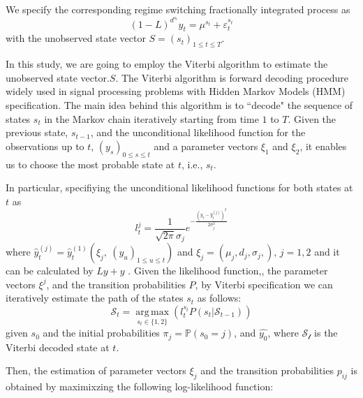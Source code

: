 \documentclass[11pt,fleqn]{article}
\DeclareMathOperator*{\argmax}{arg\,max}
\begin{document}
We specify the corresponding regime switching fractionally integrated
process as 
\begin{equation}
\left( 1-L\right) ^{d^{s_{t}}}y_{t}=\mu ^{s_{t}}+\varepsilon _{t}^{s_{t}}
\end{equation}
with the unobserved state vector $S=(s_t)_{1 \leq t\leq T} $.

In this study, we are going to employ the Viterbi algorithm to estimate the
unobserved state vector.$S$. The Viterbi algorithm is forward decoding
procedure widely used in signal processing problems with Hidden Markov
Models (HMM) specification. The main idea behind this algorithm is to
\textquotedblleft decode" the sequence of states $s_{t}$ in the Markov chain
iteratively starting from time $1$ to $T$. Given the previous state, $%
s_{t-1} $, and the unconditional likelihood function for the observations up
to $t$, $(y_{s})_{0\leq s\leq t}$ and a parameter vectors $\xi _{1}$ and $%
\xi _{2}$, it enables us to choose the most probable state at $t$, i.e., $%
s_{t}$.

In particular, specifiying the unconditional likelihood functions for both
states at $t $ as 
\begin{equation}
l^j_t = \frac{1}{\sqrt{2 \pi} \sigma_{j}} e^{-\frac{ (y_{t}-\hat{y}%
^{(j)}_{t})^2}{2 \sigma_{j}^2}}
\end{equation}
where $\hat{y}^{(j)}_t=\hat{y}^{(1)}_t(\xi_j, \ (y_u)_{1 \leq u\leq t})$ and 
$\xi_j= (\mu_j, d_j,\sigma_j,) $, $j=1,2 $ and it can be calculated by $Ly+y 
$ . Given the likelihood function,, the parameter vectors $\xi^j $, and the
transition probabilities $P $, by Viterbi specification we can iteratively
estimate the path of the states $s_t $ as follows: 
\begin{equation}
\mathcal{S}_t= \argmax \limits_{s_t \in \{1,2\}}( l^{s_t}_t P(s_t|\mathcal{S}%
_{t-1}))
\end{equation}
given $s_0 $ and the initial probabilities $\pi_j = \mathbb{P}(s_0=j)$, and $%
\hat{y_0} $, where $\mathcal{S_t} $ is the Viterbi decoded state at $t $.

Then, the estimation of parameter vectors $\xi_j $ and the transition
probabilities $p_{ij} $ is obtained by maximixzing the following
log-likelihood function:
\end{document}
